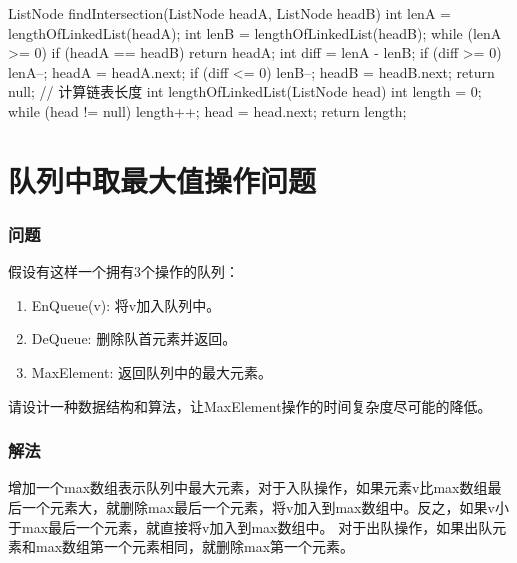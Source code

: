 \begin{Codex}[label={[$O(L)+O(1)$]Chap03_06_LinkedListIntersection.java}]
ListNode findIntersection(ListNode headA, ListNode headB) {
	int lenA = lengthOfLinkedList(headA);
	int lenB = lengthOfLinkedList(headB);
	while (lenA >= 0) {
		if (headA == headB) {
			return headA;
		}
		int diff = lenA - lenB;
		if (diff >= 0) {
			lenA--;
			headA = headA.next;
		}
		if (diff <= 0) {
			lenB--;
			headB = headB.next;
		}
	}
	return null;
}
// 计算链表长度
int lengthOfLinkedList(ListNode head) {
	int length = 0;
	while (head != null) {
		length++;
		head = head.next;
	}
	return length;
}
\end{Codex}

\section{队列中取最大值操作问题} %
\label{sec:max-queue}


\subsubsection{问题}
假设有这样一个拥有3个操作的队列：
\begin{enumerate}
	\item EnQueue(v): 将v加入队列中。
	\item DeQueue: 删除队首元素并返回。
	\item MaxElement: 返回队列中的最大元素。
\end{enumerate}

请设计一种数据结构和算法，让MaxElement操作的时间复杂度尽可能的降低。

\subsubsection{解法}
增加一个max数组表示队列中最大元素，对于入队操作，如果元素v比max数组最后一个元素大，就删除max最后一个元素，将v加入到max数组中。反之，如果v小于max最后一个元素，就直接将v加入到max数组中。
对于出队操作，如果出队元素和max数组第一个元素相同，就删除max第一个元素。

